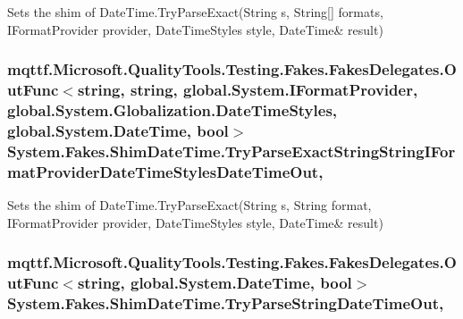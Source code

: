 Sets the shim of Date\-Time.\-Try\-Parse\-Exact(String s, String\mbox{[}\mbox{]} formats, I\-Format\-Provider provider, Date\-Time\-Styles style, Date\-Time\& result)

\hypertarget{class_system_1_1_fakes_1_1_shim_date_time_a526312cd19828ac0a49a871283e732df}{
\subsubsection[{Try\-Parse\-Exact\-String\-String\-I\-Format\-Provider\-Date\-Time\-Styles\-Date\-Time\-Out}]{\setlength{\rightskip}{0pt plus 5cm}mqttf.\-Microsoft.\-Quality\-Tools.\-Testing.\-Fakes.\-Fakes\-Delegates.\-Out\-Func$<$string, string, global.\-System.\-I\-Format\-Provider, global.\-System.\-Globalization.\-Date\-Time\-Styles, global.\-System.\-Date\-Time, bool$>$ System.\-Fakes.\-Shim\-Date\-Time.\-Try\-Parse\-Exact\-String\-String\-I\-Format\-Provider\-Date\-Time\-Styles\-Date\-Time\-Out\hspace{0.3cm}{\ttfamily [static]}, {\ttfamily [set]}}}\label{class_system_1_1_fakes_1_1_shim_date_time_a526312cd19828ac0a49a871283e732df}


Sets the shim of Date\-Time.\-Try\-Parse\-Exact(String s, String format, I\-Format\-Provider provider, Date\-Time\-Styles style, Date\-Time\& result)

\hypertarget{class_system_1_1_fakes_1_1_shim_date_time_a9203cb2a571663e378753ccbc41c846e}{
\subsubsection[{Try\-Parse\-String\-Date\-Time\-Out}]{\setlength{\rightskip}{0pt plus 5cm}mqttf.\-Microsoft.\-Quality\-Tools.\-Testing.\-Fakes.\-Fakes\-Delegates.\-Out\-Func$<$string, global.\-System.\-Date\-Time, bool$>$ System.\-Fakes.\-Shim\-Date\-Time.\-Try\-Parse\-String\-Date\-Time\-Out\hspace{0.3cm}{\ttfamily [static]}, {\ttfamily [set]}}}\label{class_system_1_1_fakes_1_1_shim_date_time_a9203cb2a571663e378753ccbc41c846e}


